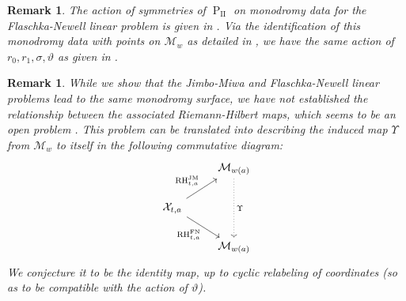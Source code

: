 \documentclass[a4paper,reqno]{amsart}
\numberwithin{equation}{section}
\newcommand{\pain}[1]{\operatorname{P}_{\mathrm{#1}}}
\newtheorem{remark}[theorem]{Remark}
\numberwithin{equation}{section}
\begin{document}
\begin{remark} \label{rem:symmetriesonlinearproblemFNPII}
    The action of symmetries of $\pain{II}$ on monodromy data for the Flaschka-Newell linear problem is given in \cite[Eq. (2.6)]{kapaev91_essential}. 
    Via the identification of this monodromy data with points on $\mathcal{M}_w$ as detailed in , we have the same action of $r_0,r_1,\sigma,\vartheta$ as given in . 
 

\end{remark}





\begin{remark} \label{rem:commutingRHsPII}
    While we show that the Jimbo-Miwa and Flaschka-Newell linear problems lead to the same monodromy surface, we have not established the relationship between the associated Riemann-Hilbert maps, which seems to be an open problem \cite[Sec. 2.2]{millerincreasing18}. 
    This problem can be translated into describing the induced map $\Upsilon$ from $\mathcal{M}_w$ to itself in the following commutative diagram:
    \begin{equation*}
    \begin{tikzcd}
    & \mathcal{M}_{w(a)} \arrow[dd,dotted, "\Upsilon"]\\
        \mathcal{X}_{t,a}  \arrow[ur, "\operatorname{RH}^{\operatorname{JM}}_{t,a}"] \arrow[dr,swap, "\operatorname{RH}^{\operatorname{FN}}_{t,a}"]& \\
    & \mathcal{M}_{w(a)}         
    \end{tikzcd}
\end{equation*}
We conjecture it to be the identity map, up to cyclic relabeling of coordinates (so as to be compatible with the action of $\vartheta$).


\end{remark}
\end{document}

